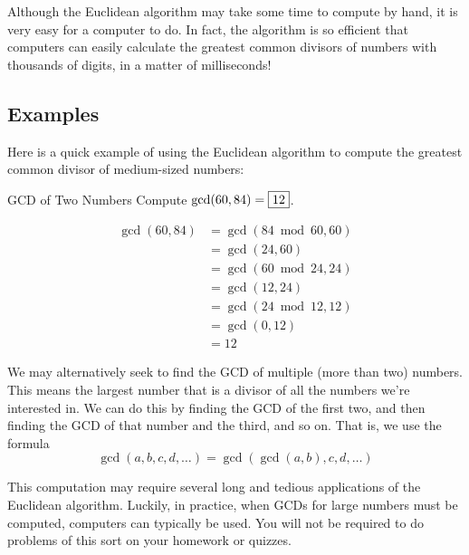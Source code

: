 \documentclass[a4paper,10pt]{report}
\begin{document}
Although the Euclidean algorithm may take some time to compute by hand, it is
very easy for a computer to do. In fact, the algorithm is so efficient that
computers can easily calculate the greatest common divisors of numbers with
thousands of digits, in a matter of milliseconds!

\subsection{Examples}

Here is a quick example of using the Euclidean algorithm to compute the
greatest common divisor of medium-sized numbers:

\begin{problem}{GCD of Two Numbers}
 Compute \(\gcd(60, 84) = \Ans{12}\).

 \begin{solution}
  \begin{align*}
   \gcd(60, 84)
   &= \gcd(84 \bmod 60, 60) \\
   &= \gcd(24, 60) \\
   &= \gcd(60 \bmod 24, 24) \\
   &= \gcd(12, 24) \\
   &= \gcd(24 \bmod 12, 12) \\
   &= \gcd(0, 12) \\
   &= 12
  \end{align*}
 \end{solution}
\end{problem}

We may alternatively seek to find the GCD of multiple (more than two) numbers.
This means the largest number that is a divisor of all the numbers we're
interested in. We can do this by finding the GCD of the first two, and then
finding the GCD of that number and the third, and so on. That is, we use the
formula \[
 \gcd(a, b, c, d, \dots) = \gcd(\gcd(a, b), c, d, \dots)
\]

This computation may require several long and tedious applications of the
Euclidean algorithm. Luckily, in practice, when GCDs for large numbers must be
computed, computers can typically be used. You will not be required to do
problems of this sort on your homework or quizzes.
\end{document}
